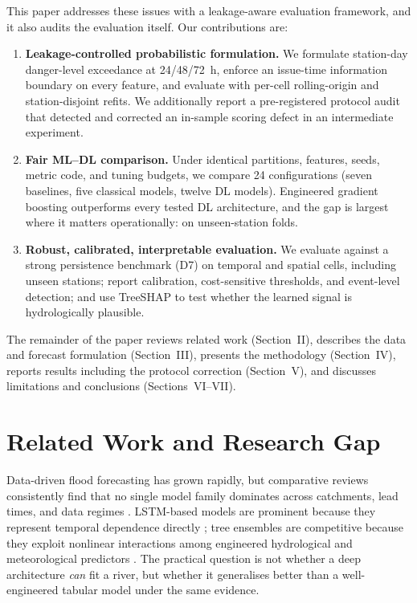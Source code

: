 \documentclass[conference]{IEEEtran}
\begin{document}
This paper addresses these issues with a leakage-aware evaluation framework, and it also audits the evaluation itself. Our contributions are:

\begin{enumerate}
\item \textbf{Leakage-controlled probabilistic formulation.} We formulate station-day danger-level exceedance at 24/48/72~h, enforce an issue-time information boundary on every feature, and evaluate with per-cell rolling-origin and station-disjoint refits. We additionally report a pre-registered protocol audit that detected and corrected an in-sample scoring defect in an intermediate experiment.
\item \textbf{Fair ML--DL comparison.} Under identical partitions, features, seeds, metric code, and tuning budgets, we compare 24 configurations (seven baselines, five classical models, twelve DL models). Engineered gradient boosting outperforms every tested DL architecture, and the gap is largest where it matters operationally: on unseen-station folds.
\item \textbf{Robust, calibrated, interpretable evaluation.} We evaluate against a strong persistence benchmark (D7) on temporal and spatial cells, including unseen stations; report calibration, cost-sensitive thresholds, and event-level detection; and use TreeSHAP to test whether the learned signal is hydrologically plausible.
\end{enumerate}

The remainder of the paper reviews related work (Section~II), describes the data and forecast formulation (Section~III), presents the methodology (Section~IV), reports results including the protocol correction (Section~V), and discusses limitations and conclusions (Sections~VI--VII).

\section{Related Work and Research Gap}

Data-driven flood forecasting has grown rapidly, but comparative reviews consistently find that no single model family dominates across catchments, lead times, and data regimes \cite{asif2025review,kuhaneswaran2025evolution,akinsoji2024integrating}. LSTM-based models are prominent because they represent temporal dependence directly \cite{hochreiter1997long,noor2022water}; tree ensembles are competitive because they exploit nonlinear interactions among engineered hydrological and meteorological predictors \cite{chen2016xgboost,ke2017lightgbm}. The practical question is not whether a deep architecture \emph{can} fit a river, but whether it generalises better than a well-engineered tabular model under the same evidence.
\end{document}
